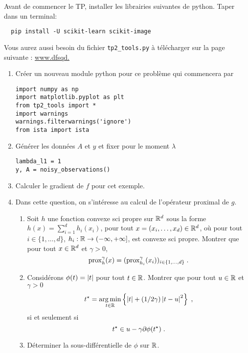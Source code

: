 \documentclass[a4paper,french,12pt]{article}
\begin{document}
Avant de commencer le TP, installer les librairies suivantes de python. Taper dans un terminal:
\begin{lstlisting}
  pip install -U scikit-learn scikit-image
\end{lstlisting}

Vous aurez aussi besoin du fichier \lstinline+tp2_tools.py+ à télécharger sur la page suivante : \url{www.dfsqd.}

\begin{enumerate}
\item Créer un nouveau module python pour ce problème qui commencera par
\begin{lstlisting}
import numpy as np
import matplotlib.pyplot as plt
from tp2_tools import *
import warnings
warnings.filterwarnings('ignore')
from ista import ista
\end{lstlisting}
\item Générer les données $A$ et $y$ et fixer pour le moment $\lambda$
  \begin{lstlisting}
lambda_l1 = 1
y, A = noisy_observations()
  \end{lstlisting}
\item Calculer le gradient de $f$ pour cet exemple.
\item Dans cette question, on s'intéresse au calcul de l'opérateur
  proximal de $g$.
  \begin{enumerate}
  \item Soit $h$ une fonction convexe sci propre sur $\mathbb{R}^d$ sous la
    forme $h(x)= \sum_{i=1}^d h_i(x_i)$, pour tout
    $x = (x_i,\ldots,x_d)\in \mathbb{R}^d$, où pour tout
    $i \in \{1,\ldots,d\}$,
    $h_i : \mathbb{R} \to \left(-\infty,+\infty\right]$, est convexe sci
    propre. Montrer que pour tout $x \in \mathbb{R}^d$ et $\gamma >0$,
    \begin{equation*}
      \operatorname{prox}_h^{\gamma}(x) = (      \operatorname{prox}_{h_i}^{\gamma}(x_i))_{i \in \{1,\ldots,d\}} \;. 
    \end{equation*}
  \item Considérons $\phi(t) = \left\vert t \right\vert$ pour tout $t \in \mathbb{R}$.
    Montrer que pour tout $u \in \mathbb{R}$ et $\gamma >0$
    \begin{equation*}
      t^{\star} = \mathop{\mathrm{arg\,min}}_{t \in \mathbb{R}} \left\lbrace \left\vert t \right\vert + (1/2\gamma) \left\vert t-u \right\vert^2 \right\rbrace \;,
    \end{equation*}
    si et seulement si
    \begin{equation*}
      t^{\star} \in u - \gamma \partial \phi(t^{\star}) \;. 
    \end{equation*}
  \item Déterminer la sous-différentielle de $\phi$ sur $\mathbb{R}$.
    

\end{enumerate}
\end{enumerate}
\end{document}
